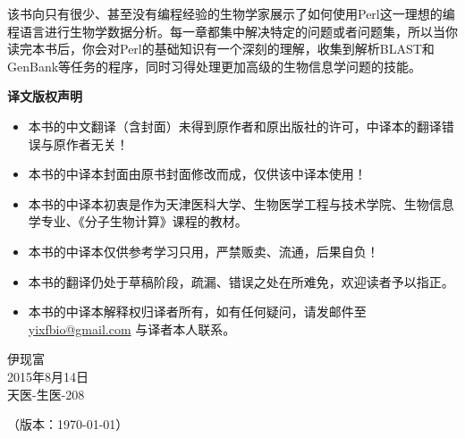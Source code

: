 \thispagestyle{empty}
该书向只有很少、甚至没有编程经验的生物学家展示了如何使用Perl这一理想的编程语言进行生物学数据分析。每一章都集中解决特定的问题或者问题集，所以当你读完本书后，你会对Perl的基础知识有一个深刻的理解，收集到解析BLAST和GenBank等任务的程序，同时习得处理更加高级的生物信息学问题的技能。

\vfill
\begin{mdframed}[linecolor=red,linewidth=2pt,backgroundcolor=red!10]
\begin{center}
{\LARGE \bf 译文版权声明}
\end{center}

\vspace{1em}

\begin{itemize}
  \item 本书的中文翻译（含封面）未得到原作者和原出版社的许可，中译本的翻译错误与原作者无关！
  \item 本书的中译本封面由原书封面修改而成，仅供该中译本使用！
  \item 本书的中译本初衷是作为天津医科大学、生物医学工程与技术学院、生物信息学专业、《分子生物计算》课程的教材。
  \item 本书的中译本仅供参考学习只用，严禁贩卖、流通，后果自负！
  \item 本书的翻译仍处于草稿阶段，疏漏、错误之处在所难免，欢迎读者予以指正。
  \item 本书的中译本解释权归译者所有，如有任何疑问，请发邮件至 \href{mailto:yixfbio@gmail.com}{yixfbio@gmail.com} 与译者本人联系。
\end{itemize}
\begin{flushright}
伊现富\\
2015年8月14日\\
天医-生医-208
\end{flushright}

\begin{center}
（版本：\today）
\end{center}
\end{mdframed}

\newpage
\null
\thispagestyle{empty}
\newpage
